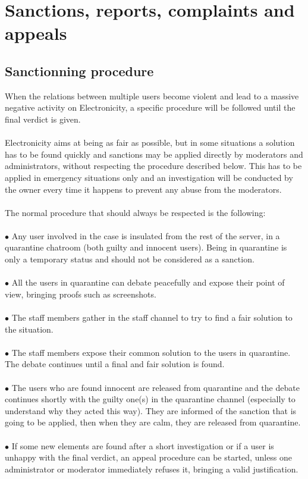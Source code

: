 \documentclass[a4paper]{article}
\begin{document}
\section{Sanctions, reports, complaints and appeals}
\label{sec:sanctions}

\subsection{Sanctionning procedure}
When the relations between multiple users become violent and lead to a massive negative activity on Electronicity, a specific procedure will be followed until the final verdict is given.\\
\\
Electronicity aims at being as fair as possible, but in some situations a solution has to be found quickly and sanctions may be applied directly by moderators and administrators, without respecting the procedure described below.  This has to be applied in emergency situations only and an investigation will be conducted by the owner every time it happens to prevent any abuse from the moderators.\\
\\
The normal procedure that should always be respected is the following:\\\\
$\bullet$ Any user involved in the case is insulated from the rest of the server, in a quarantine chatroom (both guilty and innocent users). Being in quarantine is only a temporary status and should not be considered as a sanction.\\\\
$\bullet$ All the users in quarantine can debate peacefully and expose their point of view, bringing proofs such as screenshots.\\\\
$\bullet$ The staff members gather in the staff channel to try to find a fair solution to the situation.\\\\
$\bullet$ The staff members expose their common solution to the users in quarantine. The debate continues until a final and fair solution is found.\\\\
$\bullet$ The users who are found innocent are released from quarantine and the debate continues shortly with the guilty one(s) in the quarantine channel (especially to understand why they acted this way). They are informed of the sanction that is going to be applied, then when they are calm, they are released from quarantine.\\\\
$\bullet$ If some new elements are found after a short investigation or if a user is unhappy with the final verdict, an appeal procedure can be started, unless one administrator or moderator immediately refuses it, bringing a valid justification.
\end{document}
